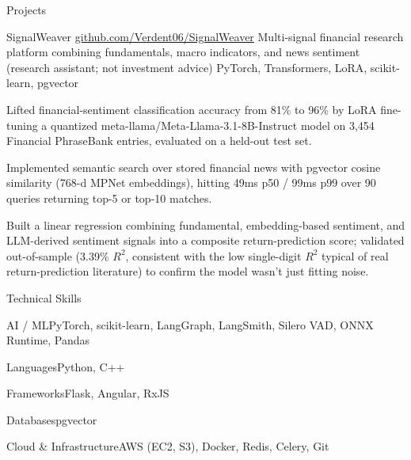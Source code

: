 \documentclass[
	11pt
]{../../template}
\begin{document}
	\begin{rSection}{P}{rojects}
		\begin{rSectionEntry}
			{SignalWeaver}
			{\href{https://github.com/Verdent06/SignalWeaver}{github.com/Verdent06/SignalWeaver}}
			{Multi-signal financial research platform combining fundamentals, macro indicators, and news sentiment (research assistant; not investment advice)}
			{PyTorch, Transformers, LoRA, scikit-learn, pgvector}
			{}

			\item Lifted financial-sentiment classification accuracy from 81\% to 96\% by LoRA fine-tuning a quantized meta-llama/Meta-Llama-3.1-8B-Instruct model on 3,454 Financial PhraseBank entries, evaluated on a held-out test set.
			\item Implemented semantic search over stored financial news with pgvector cosine similarity (768-d MPNet embeddings), hitting 49ms p50 / 99ms p99 over 90 queries returning top-5 or top-10 matches.
			\item Built a linear regression combining fundamental, embedding-based sentiment, and LLM-derived sentiment signals into a composite return-prediction score; validated out-of-sample (3.39\% $R^{2}$, consistent with the low single-digit $R^{2}$ typical of real return-prediction literature) to confirm the model wasn't just fitting noise.
		\end{rSectionEntry}
	\end{rSection}

	\begin{rSection}{T}{echnical Skills}
		\begin{rSet}{AI / ML}{PyTorch, scikit-learn, LangGraph, LangSmith, Silero VAD, ONNX Runtime, Pandas}
		\end{rSet}
		\begin{rSet}{Languages}{Python, C++}
		\end{rSet}
		\begin{rSet}{Frameworks}{Flask, Angular, RxJS}
		\end{rSet}
		\begin{rSet}{Databases}{pgvector}
		\end{rSet}
		\begin{rSet}{Cloud \& Infrastructure}{AWS (EC2, S3), Docker, Redis, Celery, Git}
		\end{rSet}
	\end{rSection}
\end{document}
